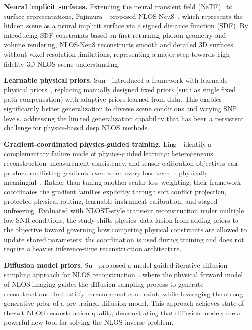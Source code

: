 \vspace{0.8mm}
\noindent \textbf{Neural implicit surfaces.}
Extending the neural transient field (NeTF)~\cite{shenNonlineofsightImagingNeural2021} to surface representations, Fujimura~\etal~proposed NLOS-NeuS~\cite{fujimuraNLOSNeuS2023}, which represents the hidden scene as a neural implicit surface via a signed distance function (SDF). By introducing SDF constraints based on first-returning photon geometry and volume rendering, NLOS-NeuS reconstructs smooth and detailed 3D surfaces without voxel resolution limitations, representing a major step towards high-fidelity 3D NLOS scene understanding.

\vspace{0.8mm}
\noindent \textbf{Learnable physical priors.}
Sun~\etal~introduced a framework with learnable physical priors~\cite{sunGeneralizable2025}, replacing manually designed fixed priors (such as single fixed path compensation) with adaptive priors learned from data. This enables significantly better generalization to diverse scene conditions and varying SNR levels, addressing the limited generalization capability that has been a persistent challenge for physics-based deep NLOS methods.

\vspace{0.8mm}
\noindent \textbf{Gradient-coordinated physics-guided training.}
Ling~\etal~identify a complementary failure mode of physics-guided learning: heterogeneous reconstruction, measurement-consistency, and sensor-calibration objectives can produce conflicting gradients even when every loss term is physically meaningful~\cite{lingSymmetryGradientNLOS2026}. Rather than tuning another scalar loss weighting, their framework coordinates the gradient families explicitly through soft conflict projection, protected physical routing, learnable instrument calibration, and staged unfreezing. Evaluated with NLOST-style transient reconstruction under multiple low-SNR conditions, the study shifts physics--data fusion from adding priors to the objective toward governing how competing physical constraints are allowed to update shared parameters; the coordination is used during training and does not require a heavier inference-time reconstruction architecture.

\vspace{0.8mm}
\noindent \textbf{Diffusion model priors.}
Su~\etal~proposed a model-guided iterative diffusion sampling approach for NLOS reconstruction~\cite{suModelGuidedDiffusion2024}, where the physical forward model of NLOS imaging guides the diffusion sampling process to generate reconstructions that satisfy measurement constraints while leveraging the strong generative prior of a pre-trained diffusion model. This approach achieves state-of-the-art NLOS reconstruction quality, demonstrating that diffusion models are a powerful new tool for solving the NLOS inverse problem.

